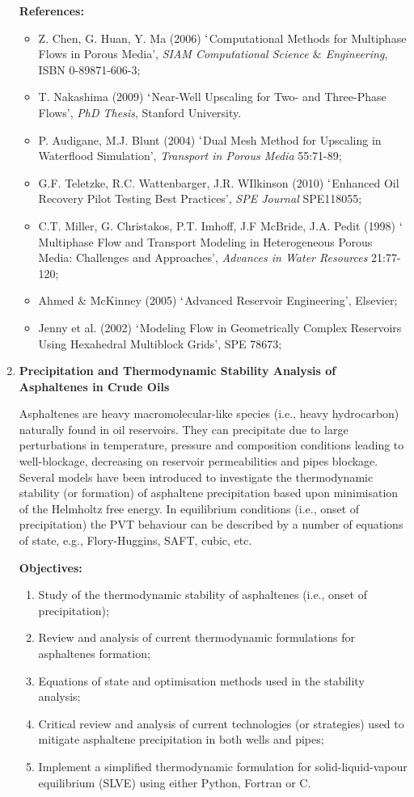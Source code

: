 \documentclass[12pts,a4paper,amsmath,amssymb,floatfix]{article}%
\begin{document}
\begin{enumerate}[label=\bfseries Project:]
\noindent
{\bf References:}
\begin{itemize}
\item Z. Chen, G. Huan, Y. Ma (2006) $\lq$Computational Methods for Multiphase Flows in Porous Media', {\it SIAM Computational Science $\&$ Engineering}, ISBN 0-89871-606-3;
\item T. Nakashima (2009) $\lq$Near-Well Upscaling for Two- and Three-Phase Flows', {\it PhD Thesis}, Stanford University.
\item P. Audigane, M.J. Blunt (2004) $\lq$Dual Mesh Method for Upscaling in Waterflood Simulation', {\it Transport in Porous Media} 55:71-89;
\item G.F. Teletzke, R.C. Wattenbarger, J.R. WIlkinson (2010) $\lq$Enhanced Oil Recovery Pilot Testing Best Practices', {\it SPE Journal} SPE118055;
\item C.T. Miller, G. Christakos, P.T. Imhoff, J.F McBride, J.A. Pedit (1998) $\lq$Multiphase Flow and Transport Modeling in Heterogeneous Porous Media: Challenges and Approaches', {\it Advances in Water Resources} 21:77-120;
\item  Ahmed $\&$ McKinney (2005) $\lq$Advanced Reservoir Engineering’, Elsevier;
\item Jenny et al. (2002) $\lq$Modeling Flow in Geometrically Complex Reservoirs Using Hexahedral Multiblock Grids’, SPE 78673;
\end{itemize}


\clearpage
\item {\bf Precipitation and Thermodynamic Stability Analysis of Asphaltenes in Crude Oils}

Asphaltenes are heavy macromolecular-like species (i.e., heavy hydrocarbon) naturally found in oil reservoirs. They can precipitate due to large perturbations in temperature, pressure and composition conditions leading to well-blockage, decreasing on reservoir permeabilities and pipes blockage. Several models have been introduced to investigate the thermodynamic stability (or formation) of asphaltene precipitation based upon minimisation of the Helmholtz free energy. In equilibrium conditions (i.e., onset of precipitation) the PVT behaviour can be described by a number of equations of state, e.g., Flory-Huggins, SAFT, cubic, etc. 

\noindent
{\bf Objectives:}
\begin{enumerate}
\item Study of the thermodynamic stability of asphaltenes (i.e., onset of precipitation); 
\item Review and analysis of current thermodynamic formulations for asphaltenes formation; 
\item Equations of state and optimisation methods used in the stability analysis; 
\item Critical review and analysis of current technologies (or strategies) used to mitigate asphaltene precipitation in both wells and pipes;
\item Implement a simplified thermodynamic formulation for solid-liquid-vapour equilibrium (SLVE) using either Python, Fortran or C.
\end{enumerate} 
 

\end{enumerate}
\end{document}
